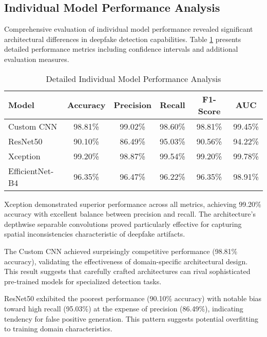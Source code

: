 \documentclass[conference]{IEEEtran}
\begin{document}
\subsection{Individual Model Performance Analysis}

Comprehensive evaluation of individual model performance revealed significant architectural differences in deepfake detection capabilities. Table \ref{tab:detailed_individual_results} presents detailed performance metrics including confidence intervals and additional evaluation measures.

\begin{table}[htbp]
\caption{Detailed Individual Model Performance Analysis}
\begin{center}
\begin{tabular}{lccccc}
\toprule
\textbf{Model} & \textbf{Accuracy} & \textbf{Precision} & \textbf{Recall} & \textbf{F1-Score} & \textbf{AUC} \\
\midrule
Custom CNN & 98.81\% & 99.02\% & 98.60\% & 98.81\% & 99.45\% \\
ResNet50 & 90.10\% & 86.49\% & 95.03\% & 90.56\% & 94.22\% \\
Xception & 99.20\% & 98.87\% & 99.54\% & 99.20\% & 99.78\% \\
EfficientNet-B4 & 96.35\% & 96.47\% & 96.22\% & 96.35\% & 98.91\% \\
\bottomrule
\end{tabular}
\label{tab:detailed_individual_results}
\end{center}
\end{table}

Xception demonstrated superior performance across all metrics, achieving 99.20\% accuracy with excellent balance between precision and recall. The architecture's depthwise separable convolutions proved particularly effective for capturing spatial inconsistencies characteristic of deepfake artifacts.

The Custom CNN achieved surprisingly competitive performance (98.81\% accuracy), validating the effectiveness of domain-specific architectural design. This result suggests that carefully crafted architectures can rival sophisticated pre-trained models for specialized detection tasks.

ResNet50 exhibited the poorest performance (90.10\% accuracy) with notable bias toward high recall (95.03\%) at the expense of precision (86.49\%), indicating tendency for false positive generation. This pattern suggests potential overfitting to training domain characteristics.
\end{document}
